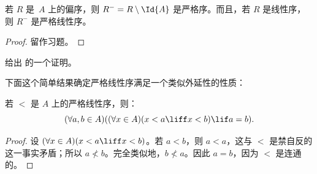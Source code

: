 \documentclass[../../../include/open-logic-section]{subfiles}
\begin{document}
\begin{prop}
若 $R$ 是~$A$ 上的偏序，则 $R^- = R \setminus \Id{A}$ 是严格序。而且，若 $R$ 是线性序，则 $R^-$ 是严格线性序。
\end{prop}

\begin{proof}
留作习题。
\end{proof}

\begin{prob}
给出  的一个证明。
\end{prob}

下面这个简单结果确定严格线性序满足一个类似外延性的性质：

\begin{prop}
若 $<$ 是 $A$ 上的严格线性序，则：
\[
  (\forall a, b \in A)((\forall x \in A)(x < a \liff x < b) \lif a = b).
\]
\end{prop}

\begin{proof}
设 $(\forall x \in A)(x < a \liff x < b)$。若 $a < b$，则 $a < a$，这与 $<$ 是禁自反的这一事实矛盾；所以 $a \nless b$。完全类似地，$b \nless a$。因此 $a = b$，因为 $<$ 是连通的。
\end{proof}
\end{document}

